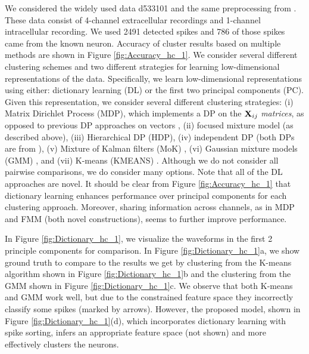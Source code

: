 \documentclass[journal]{IEEEtran}
\begin{document}
We considered
the widely used data d533101 and the same
preprocessing from \cite{Calabrese2010}.
  These data consist of 4-channel extracellular recordings and 1-channel
  intracellular recording.  We used 2491 detected spikes and 786 of those
  spikes came from the known neuron. Accuracy of cluster results based on multiple methods are shown in Figure \ref{fig:Accuracy_hc_1}. 
We consider several different clustering schemes and two different strategies for learning low-dimensional representations of the data.  Specifically, we learn low-dimensional representations using either: dictionary learning (DL) or the first two principal components (PC).  Given this representation, we consider several different clustering strategies: (i) Matrix Dirichlet Process (MDP), which implements a DP on the ${\mathbf X}_{ij}$ \emph{matrices}, as opposed to previous DP approaches on vectors \cite{Wood2009, Bo2011}, (ii) focused mixture model (as described above), (iii) Hierarchical DP (HDP), (iv) independent DP (both DPs are from \cite{Bo2011}), (v) Mixture of Kalman filters (MoK) \cite{Calabrese2010}, (vi) Gaussian mixture models (GMM) \cite{bishop2006}, and (vii) K-means (KMEANS) \cite{Lewicki}.  Although we do not consider all pairwise comparisons, we do consider many options.  Note that all of the DL approaches are novel.  It should be clear from Figure \ref{fig:Accuracy_hc_1} that dictionary learning enhances performance over principal components for each clustering approach. Moreover, sharing information across channels, as in MDP and FMM (both novel constructions), seems to further improve performance.   

In Figure \ref{fig:Dictionary_hc_1}, we visualize the waveforms in the first 2 principle components for comparison.  In Figure \ref{fig:Dictionary_hc_1}a, we show ground truth to compare to the results we get by clustering from the K-means algorithm shown in Figure \ref{fig:Dictionary_hc_1}b and the clustering from the GMM shown in  Figure \ref{fig:Dictionary_hc_1}c.  We observe that both K-means and GMM work well, but due to the constrained feature space they incorrectly classify some spikes (marked by arrows). However, the proposed model, shown in Figure  \ref{fig:Dictionary_hc_1}(d), which incorporates dictionary learning with spike sorting, infers an appropriate feature space (not shown) and more effectively clusters the neurons.
\end{document}
